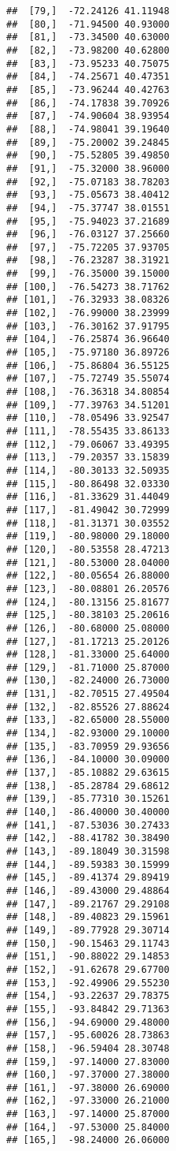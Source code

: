 \documentclass[]{article}
\begin{document}
\begin{verbatim}
##  [79,]  -72.24126 41.11948
##  [80,]  -71.94500 40.93000
##  [81,]  -73.34500 40.63000
##  [82,]  -73.98200 40.62800
##  [83,]  -73.95233 40.75075
##  [84,]  -74.25671 40.47351
##  [85,]  -73.96244 40.42763
##  [86,]  -74.17838 39.70926
##  [87,]  -74.90604 38.93954
##  [88,]  -74.98041 39.19640
##  [89,]  -75.20002 39.24845
##  [90,]  -75.52805 39.49850
##  [91,]  -75.32000 38.96000
##  [92,]  -75.07183 38.78203
##  [93,]  -75.05673 38.40412
##  [94,]  -75.37747 38.01551
##  [95,]  -75.94023 37.21689
##  [96,]  -76.03127 37.25660
##  [97,]  -75.72205 37.93705
##  [98,]  -76.23287 38.31921
##  [99,]  -76.35000 39.15000
## [100,]  -76.54273 38.71762
## [101,]  -76.32933 38.08326
## [102,]  -76.99000 38.23999
## [103,]  -76.30162 37.91795
## [104,]  -76.25874 36.96640
## [105,]  -75.97180 36.89726
## [106,]  -75.86804 36.55125
## [107,]  -75.72749 35.55074
## [108,]  -76.36318 34.80854
## [109,]  -77.39763 34.51201
## [110,]  -78.05496 33.92547
## [111,]  -78.55435 33.86133
## [112,]  -79.06067 33.49395
## [113,]  -79.20357 33.15839
## [114,]  -80.30133 32.50935
## [115,]  -80.86498 32.03330
## [116,]  -81.33629 31.44049
## [117,]  -81.49042 30.72999
## [118,]  -81.31371 30.03552
## [119,]  -80.98000 29.18000
## [120,]  -80.53558 28.47213
## [121,]  -80.53000 28.04000
## [122,]  -80.05654 26.88000
## [123,]  -80.08801 26.20576
## [124,]  -80.13156 25.81677
## [125,]  -80.38103 25.20616
## [126,]  -80.68000 25.08000
## [127,]  -81.17213 25.20126
## [128,]  -81.33000 25.64000
## [129,]  -81.71000 25.87000
## [130,]  -82.24000 26.73000
## [131,]  -82.70515 27.49504
## [132,]  -82.85526 27.88624
## [133,]  -82.65000 28.55000
## [134,]  -82.93000 29.10000
## [135,]  -83.70959 29.93656
## [136,]  -84.10000 30.09000
## [137,]  -85.10882 29.63615
## [138,]  -85.28784 29.68612
## [139,]  -85.77310 30.15261
## [140,]  -86.40000 30.40000
## [141,]  -87.53036 30.27433
## [142,]  -88.41782 30.38490
## [143,]  -89.18049 30.31598
## [144,]  -89.59383 30.15999
## [145,]  -89.41374 29.89419
## [146,]  -89.43000 29.48864
## [147,]  -89.21767 29.29108
## [148,]  -89.40823 29.15961
## [149,]  -89.77928 29.30714
## [150,]  -90.15463 29.11743
## [151,]  -90.88022 29.14853
## [152,]  -91.62678 29.67700
## [153,]  -92.49906 29.55230
## [154,]  -93.22637 29.78375
## [155,]  -93.84842 29.71363
## [156,]  -94.69000 29.48000
## [157,]  -95.60026 28.73863
## [158,]  -96.59404 28.30748
## [159,]  -97.14000 27.83000
## [160,]  -97.37000 27.38000
## [161,]  -97.38000 26.69000
## [162,]  -97.33000 26.21000
## [163,]  -97.14000 25.87000
## [164,]  -97.53000 25.84000
## [165,]  -98.24000 26.06000

\end{verbatim}
\end{document}
